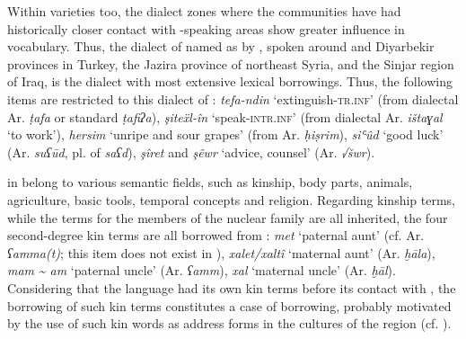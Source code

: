 \documentclass[output=paper]{langsci/langscibook}
\begin{document}
Within varieties too, the dialect zones where the communities have had historically closer contact with -speaking areas show greater  influence in vocabulary. Thus, the dialect of   named as   by  \citet{ÖpenginHaig2014}, spoken around  and Diyarbekir provinces in Turkey, the Jazira province of northeast Syria, and the Sinjar region of Iraq, is the dialect with most extensive  lexical borrowings. Thus, the following items are restricted to this dialect of  : \textit{tefa-ndin} ‘extinguish-\textsc{tr.inf}’ (from dialectal Ar. \textit{ṭafa} or standard \textit{ṭafiʔa}), \textit{şiteẍl-în} ‘speak-\textsc{intr.inf}’ (from dialectal Ar. \textit{ištaɣal} ‘to work’), \textit{hersim} ‘unripe and sour grapes’ (from Ar. \textit{ḥiṣrim}), \textit{siʿûd} ‘good luck’ (Ar. \textit{suʕūd}, pl. of \textit{saʕd}), \textit{şîret} and \textit{şêwr} ‘advice, counsel’ (Ar. \textit{√šwr}).     

  in  belong to various semantic fields, such as kinship, body parts, animals, agriculture, basic tools, temporal concepts and religion. Regarding kinship terms, while the terms for the members of the nuclear family are all inherited, the four second-degree kin terms are all borrowed from : \textit{met} ‘paternal aunt’ (cf. Ar. \textit{ʕamma(t)}; this item does not exist in ), \textit{xalet/xaltî} ‘maternal aunt’ (Ar. \textit{ḫāla}), \textit{mam} \textit{{\textasciitilde} am} ‘paternal uncle’ (Ar. \textit{ʕamm}), \textit{xal} ‘maternal uncle’ (Ar. \textit{ḫāl}). Considering that the language had its own kin terms before its contact with , the borrowing of such kin terms constitutes a case of  borrowing, probably motivated by the use of such kin words as address forms in the cultures of the region (cf. \citealt{HaigÖpengin2015}).
\end{document}
